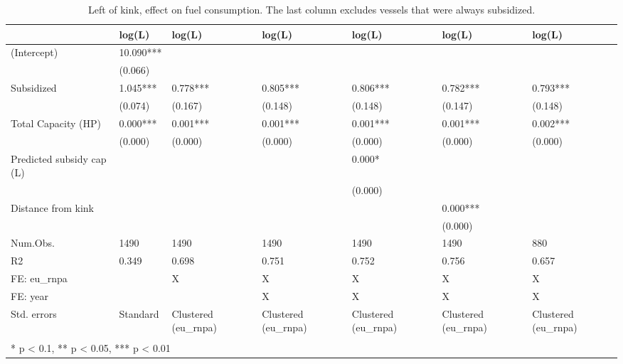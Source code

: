 \begin{table}

\caption{\label{tab:}Left of kink, effect on fuel consumption. The last column excludes vessels that were always subsidized.}
\centering
\begin{tabular}[t]{lllllll}
\toprule
  & log(L) & log(L)  & log(L)   & log(L)    & log(L)     & log(L)     \\
\midrule
(Intercept) & 10.090*** &  &  &  &  & \\
 & (0.066) &  &  &  &  & \\
Subsidized & 1.045*** & 0.778*** & 0.805*** & 0.806*** & 0.782*** & 0.793***\\
 & (0.074) & (0.167) & (0.148) & (0.148) & (0.147) & (0.148)\\
Total Capacity (HP) & 0.000*** & 0.001*** & 0.001*** & 0.001*** & 0.001*** & 0.002***\\
 & (0.000) & (0.000) & (0.000) & (0.000) & (0.000) & (0.000)\\
Predicted subsidy cap (L) &  &  &  & 0.000* &  & \\
 &  &  &  & (0.000) &  & \\
Distance from kink &  &  &  &  & 0.000*** & \\
 &  &  &  &  & (0.000) & \\
\midrule
Num.Obs. & 1490 & 1490 & 1490 & 1490 & 1490 & 880\\
R2 & 0.349 & 0.698 & 0.751 & 0.752 & 0.756 & 0.657\\
FE: eu\_rnpa &  & X & X & X & X & X\\
FE: year &  &  & X & X & X & X\\
Std. errors & Standard & Clustered (eu\_rnpa) & Clustered (eu\_rnpa) & Clustered (eu\_rnpa) & Clustered (eu\_rnpa) & Clustered (eu\_rnpa)\\
\bottomrule
\multicolumn{7}{l}{\textsuperscript{} * p < 0.1, ** p < 0.05, *** p < 0.01}\\
\end{tabular}
\end{table}
